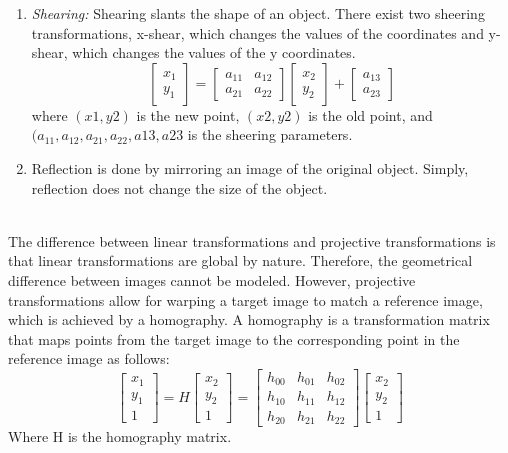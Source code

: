 \begin{enumerate}
    \item \textit{Shearing:} Shearing slants the shape of an object. There exist two sheering transformations, x-shear, which changes the values of the coordinates and y-shear, which changes the values of the y coordinates.  \begin{equation} \begin{bmatrix} x_{1} \\ y_{1} \end{bmatrix} = \begin{bmatrix} a_{11} & a_{12} \\ a_{21} & a_{22} \end{bmatrix} \begin{bmatrix} x_{2} \\ y_{2} \end{bmatrix} + \begin{bmatrix} a_{13} \\ a_{23} \end{bmatrix}  \end{equation} where $(x1, y2)$ is the new point, $(x2, y2)$ is the old point, and $(a_{11}, a_{12}, a_{21}, a_{22}, a{13}, a{23}$ is the sheering parameters.  \\
    \item {} Reflection is done by mirroring an image of the original object. Simply, reflection does not change the size of the object. 
\end{enumerate}
\ \\
\noindent The difference between linear transformations and projective transformations is that linear transformations are global by nature. Therefore, the geometrical difference between images cannot be modeled. However, projective transformations allow for warping a target image to match a reference image, which is achieved by a homography. A homography is a transformation matrix that maps points from the target image to the corresponding point in the reference image as follows:  \begin{equation} \begin{bmatrix} x_{1} \\ y_{1} \\ 1 \end{bmatrix} = H \begin{bmatrix} x_{2} \\ y_{2} \\ 1 \end{bmatrix} =  \begin{bmatrix} h_{00} & h_{01} & h_{02} \\ h_{10} & h_{11} & h_{12} \\ h_{20} & h_{21} & h_{22} \end{bmatrix} \begin{bmatrix} x_{2} \\ y_{2} \\ 1 \end{bmatrix} \end{equation} Where H is the homography matrix.  


